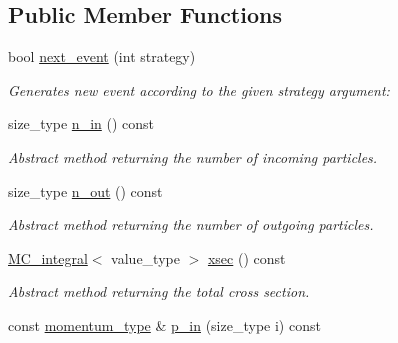 \subsection*{Public Member Functions}
\begin{DoxyCompactItemize}
\item 
\hypertarget{a00544_afc3b1ccf6c6aa0aa18847cda5f9f17fa}{}bool \hyperlink{a00544_afc3b1ccf6c6aa0aa18847cda5f9f17fa}{next\+\_\+event} (int strategy)\label{a00544_afc3b1ccf6c6aa0aa18847cda5f9f17fa}

\begin{DoxyCompactList}\small\item\em Generates new event according to the given strategy argument\+: \end{DoxyCompactList}\item 
\hypertarget{a00544_ab4ab1dab3151f985f0957fce56382c2c}{}size\+\_\+type \hyperlink{a00544_ab4ab1dab3151f985f0957fce56382c2c}{n\+\_\+in} () const \label{a00544_ab4ab1dab3151f985f0957fce56382c2c}

\begin{DoxyCompactList}\small\item\em Abstract method returning the number of incoming particles. \end{DoxyCompactList}\item 
\hypertarget{a00544_ab1772344831cd5519da309cd6d7b1c99}{}size\+\_\+type \hyperlink{a00544_ab1772344831cd5519da309cd6d7b1c99}{n\+\_\+out} () const \label{a00544_ab1772344831cd5519da309cd6d7b1c99}

\begin{DoxyCompactList}\small\item\em Abstract method returning the number of outgoing particles. \end{DoxyCompactList}\item 
\hypertarget{a00544_ae7f9a6b11942ebabd0d62ea83da4d0d7}{}\hyperlink{a00368}{M\+C\+\_\+integral}$<$ value\+\_\+type $>$ \hyperlink{a00544_ae7f9a6b11942ebabd0d62ea83da4d0d7}{xsec} () const \label{a00544_ae7f9a6b11942ebabd0d62ea83da4d0d7}

\begin{DoxyCompactList}\small\item\em Abstract method returning the total cross section. \end{DoxyCompactList}\item 
\hypertarget{a00544_a318df8eae867966ec8e6b0253495fbea}{}const \hyperlink{a00579}{momentum\+\_\+type} \& \hyperlink{a00544_a318df8eae867966ec8e6b0253495fbea}{p\+\_\+in} (size\+\_\+type i) const \label{a00544_a318df8eae867966ec8e6b0253495fbea}


\end{DoxyCompactItemize}
